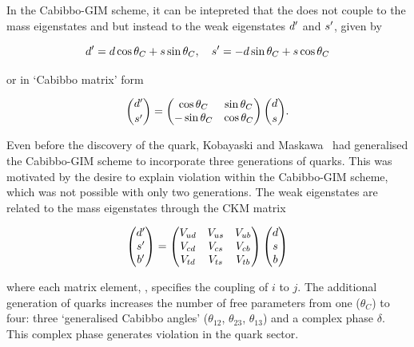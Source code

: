 In the Cabibbo-GIM scheme, it can be intepreted that the \W does not couple to the mass eigenstates \dquark and \squark but instead to the weak eigenstates ${d}^\prime$ and ${s}^\prime$, given by

\begin{equation}
{\ensuremath{d}}^\prime = {d}\cos\theta_{C}+{s}\sin\theta_{C},~~~{s}^\prime = -{d}\sin\theta_{C}+{s}\cos\theta_{C}
\end{equation}

\noindent or in `Cabibbo matrix' form

\begin{equation}
\binom{{d}^\prime}{{s}^\prime} = 
\begin{pmatrix}
\cos\theta_{C} & \sin\theta_{C} \\
-\sin\theta_{C} & \cos\theta_{C} \\
\end{pmatrix}
\binom{{d}}{{s}}.
\end{equation}

Even before the discovery of the \cquark quark, Kobayaski and Maskawa~\cite{kobayashi-maskawa} had generalised the Cabibbo-GIM scheme to incorporate three generations of quarks. This was motivated by the desire to explain \CP violation within the Cabibbo-GIM scheme, which was not possible with only two generations. The weak eigenstates are related to the mass eigenstates through the CKM matrix

\begin{equation}
\begin{pmatrix}
{\ensuremath{d}}^\prime \\
{s}^\prime \\
{b}^\prime \\
\end{pmatrix}
=
\begin{pmatrix}
{\ensuremath{V_{{u}{d}}}} & {V_{{u}{s}}} & {V_{{u}{b}}} \\
{V_{{c}{d}}} & {V_{{c}{s}}} & {V_{{c}{b}}} \\
{V_{{t}{d}}} & {V_{{t}{s}}} & {V_{{t}{b}}} \\
\end{pmatrix}
\begin{pmatrix}
{\ensuremath{d}} \\
{s} \\
{b} \\
\end{pmatrix}
\end{equation}

\noindent where each matrix element, \Vij, specifies the coupling of $i$ to $j$. The additional generation of quarks increases the number of free parameters from one ($\theta_{C}$) to four: three `generalised Cabibbo angles' ($\theta_{12}$, $\theta_{23}$, $\theta_{13}$) and a complex phase $\delta$. This complex phase generates \CP violation in the quark sector. 

